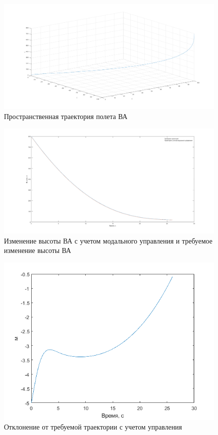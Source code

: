 \begin{figure}
	\centering
	\includegraphics[scale=0.3]{images/3d_traj.png}
	\caption{Пространственная траектория полета ВА}
	\label{fig:3d_traj}
\end{figure}
\begin{figure}
	\centering
	\includegraphics[scale=0.3]{images/pathBias.png}
	\caption{Изменение высоты ВА с учетом  модального управления и требуемое изменение высоты ВА}
	\label{fig:high}
\end{figure}

\begin{figure}
	\centering
	\includegraphics[scale=0.6]{images/error.png}
	\caption{Отклонение от требуемой траектории с учетом управления}
	\label{fig:error}
\end{figure}
\clearpage